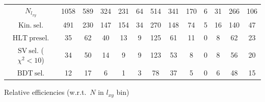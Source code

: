 \documentclass[10pt,a4paper]{article}
\begin{document}
\begin{landscape}
{\begin{tabular}{c|cccc|cccc|cccc}
\midrule
$N_{l_{xy}}$ & 1058 & 589 & 324 & 231 & 64 & 514 & 341 & 170 & 6 & 31 & 266 & 106\\
$\mathrm{Kin.\ sel.}$ & 491 & 230 & 147 & 154 & 34 & 270 & 148 & 74 & 5 & 16 & 140 & 47\\
$\mathrm{HLT\ presel.}$ & 35 & 62 & 40 & 13 & 9 & 125 & 61 & 11 & 0 & 8 & 62 & 23\\
$\mathrm{SV\ sel.}$ ($\chi^2{<}10$) & 34 & 50 & 14 & 9 & 9 & 123 & 53 & 8 & 0 & 8 & 56 & 20\\
$\mathrm{BDT\ sel.}$ & 12 & 17 & 6 & 1 & 3 & 78 & 37 & 5 & 0 & 6 & 48 & 15\\
\bottomrule
\end{tabular}}

\vspace{18pt}

Relative efficiencies (w.r.t.\ $N$ in $l_{xy}$ bin)


\end{landscape}
\end{document}
